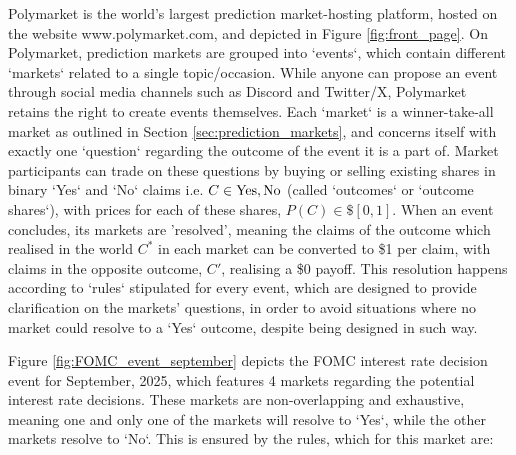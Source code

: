 
Polymarket is the world's largest prediction market-hosting platform, %
hosted on the website www.polymarket.com, and depicted in Figure \ref{fig:front_page}.
On Polymarket, prediction markets are grouped into `events`, which contain different `markets` related to a single topic/occasion.
While anyone can propose an event through social media channels such as Discord and Twitter/X, Polymarket retains the right to create events themselves.
Each `market` is a winner-take-all market as outlined in Section \ref{sec:prediction_markets}, and concerns itself with exactly one `question` regarding the outcome of the event it is a part of. Market participants can trade on these questions by buying or selling existing shares in binary `Yes` and `No` claims i.e. $C \in {\text{Yes}, \text{No}}$ (called `outcomes` or `outcome shares`), with prices for each of these shares, $P(C) \in \$[0, 1]$. %
When an event concludes, its markets are 'resolved', meaning the claims of the outcome which realised in the world $C^*$ in each market can be converted to \$1 per claim, with claims in the opposite outcome, $C'$, realising a \$0 payoff.
This resolution happens according to `rules` stipulated for every event, which are designed to provide clarification on the markets' questions, in order to avoid situations where no market could resolve to a `Yes` outcome, despite being designed in such way.
\parencite{PMDocs}

Figure \ref{fig:FOMC_event_september} depicts the FOMC interest rate decision event for September, 2025, which features 4 markets regarding the potential interest rate decisions. These markets are non-overlapping and exhaustive, meaning one and only one of the markets will resolve to `Yes`, while the other markets resolve to `No`. This is ensured by the rules, which for this market are:

